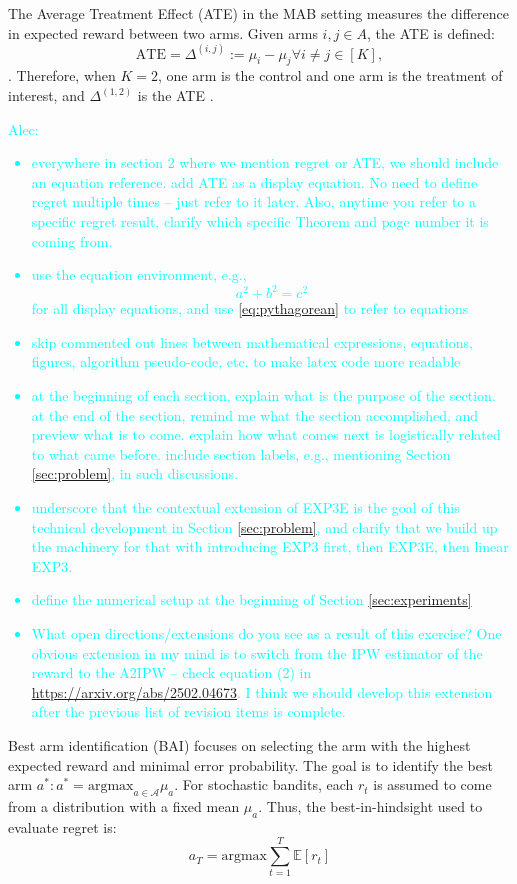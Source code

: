 The Average Treatment Effect (ATE) in the MAB setting measures the difference in expected reward between two arms. Given arms \(i, j \in A\), the ATE is defined:
\begin{equation}
\label{eq:ate}
\text{ATE} = \Delta^{(i,j)} := \mu_i - \mu_j\forall i \neq j \in [K],
\end{equation}. Therefore, when \( K = 2\), one arm is the control and one arm is the treatment of interest, and \(\Delta^{(1,2)}\) is the ATE \citep{simchilevi2023adaptive}.
\textcolor{cyan}{Alec:
\begin{itemize}
    \item everywhere in section 2 where we mention regret or ATE, we should include an equation reference. add ATE as a display equation. No need to define regret multiple times -- just refer to it later. Also, anytime you refer to a specific regret result, clarify which specific Theorem and page number it is coming from.
\item use the equation environment, e.g.,  \begin{equation}\label{eq:pythagorean}
    a^2+b^2=c^2
\end{equation} for all display equations, and use \ref{eq:pythagorean} to refer to equations
%
\item skip commented out lines between mathematical expressions, equations, figures, algorithm pseudo-code, etc. to make latex code more readable
%
\item at the beginning of each section, explain what is the purpose of the section. at the end of the section, remind me what the section accomplished, and preview what is to come. explain how what comes next is logistically related to what came before. include section labels, e.g., mentioning Section \ref{sec:problem}, in such discussions.
%
\item underscore that the contextual extension of EXP3E is the goal of this technical development in Section \ref{sec:problem}, and clarify that we build up the machinery for that with introducing EXP3 first, then EXP3E, then linear EXP3.
\item define the numerical setup at the beginning of Section \ref{sec:experiments}
%
\item What open directions/extensions do you see as a result of this exercise? One obvious extension in my mind is to switch from the IPW estimator of the reward to the A2IPW -- check equation (2) in \url{https://arxiv.org/abs/2502.04673}. I think we should develop this extension after the previous list of revision items is complete.
%
\end{itemize}
%
}
Best arm identification (BAI) focuses on selecting the arm with the highest expected reward and minimal error probability. The goal is to identify the best arm \(a^*:a^* = \text{argmax}_{a \in \mathcal{A}}\mu_{a}\). For stochastic bandits, each \(r_t\) is assumed to come from a distribution with a fixed mean \(\mu_a\). Thus, the best-in-hindsight used to evaluate regret is: \[a_T =\text{argmax}\sum_{t=1}^T \mathbb{E}[r_t]\]

